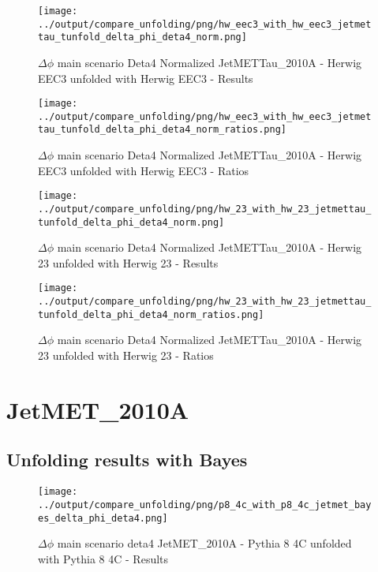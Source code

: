 \documentclass[11pt]{book}
\begin{document}
\begin{figure}[ht]
\centering
\texttt{[image: ../output/compare\_unfolding/png/hw\_eec3\_with\_hw\_eec3\_jetmettau\_tunfold\_delta\_phi\_deta4\_norm.png]}
\caption{$\Delta\phi$ main scenario Deta4 Normalized JetMETTau\_2010A - Herwig EEC3 unfolded with Herwig EEC3 - Results}
\label{hw_eec3_hw_eec3_jetmettau_tunfold_delta_phi_deta4_norm_a}
\end{figure}

\begin{figure}[ht]
\centering
\texttt{[image: ../output/compare\_unfolding/png/hw\_eec3\_with\_hw\_eec3\_jetmettau\_tunfold\_delta\_phi\_deta4\_norm\_ratios.png]}
\caption{$\Delta\phi$ main scenario Deta4 Normalized JetMETTau\_2010A - Herwig EEC3 unfolded with Herwig EEC3 - Ratios}
\label{hw_eec3_hw_eec3_jetmettau_tunfold_delta_phi_deta4_norm_b}
\end{figure}

\begin{figure}[ht]
\centering
\texttt{[image: ../output/compare\_unfolding/png/hw\_23\_with\_hw\_23\_jetmettau\_tunfold\_delta\_phi\_deta4\_norm.png]}
\caption{$\Delta\phi$ main scenario Deta4 Normalized JetMETTau\_2010A - Herwig 23 unfolded with Herwig 23 - Results}
\label{hw_23_hw_23_jetmettau_tunfold_delta_phi_deta4_norm_a}
\end{figure}

\begin{figure}[ht]
\centering
\texttt{[image: ../output/compare\_unfolding/png/hw\_23\_with\_hw\_23\_jetmettau\_tunfold\_delta\_phi\_deta4\_norm\_ratios.png]}
\caption{$\Delta\phi$ main scenario Deta4 Normalized JetMETTau\_2010A - Herwig 23 unfolded with Herwig 23 - Ratios}
\label{hw_23_hw_23_jetmettau_tunfold_delta_phi_deta4_norm_b}
\end{figure}


\clearpage
\section{JetMET\_2010A}
\subsection{Unfolding results with Bayes}

\begin{figure}[ht]
\centering
\texttt{[image: ../output/compare\_unfolding/png/p8\_4c\_with\_p8\_4c\_jetmet\_bayes\_delta\_phi\_deta4.png]}
\caption{$\Delta\phi$ main scenario deta4 JetMET\_2010A - Pythia 8 4C unfolded with Pythia 8 4C - Results}
\label{p8_p8_jetmet_bayes_delta_phi_deta4_a}
\end{figure}
\end{document}
